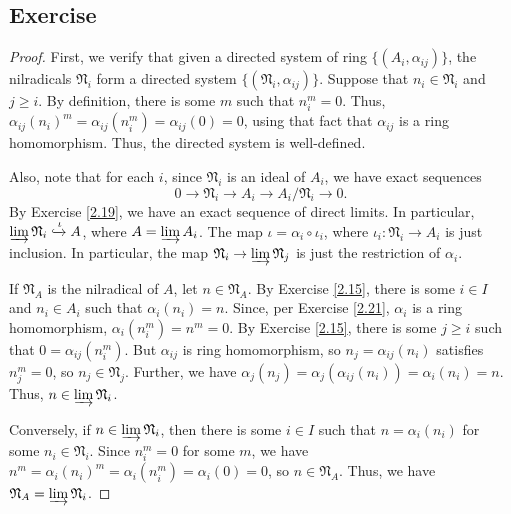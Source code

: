\subsection{Exercise}\label{2.22} %

\begin{proof}
First, we verify that given a directed system of ring $\{(A_i,\alpha_{ij})\}$, the nilradicals $\mathfrak{N}_i$ form a directed system $\{(\mathfrak{N}_i,\alpha_{ij})\}$. Suppose that
$n_i \in \mathfrak{N}_i$ and $j \ge i$. By definition, there is some $m$ such that $n_i^m = 0$. Thus, $\alpha_{ij}(n_i)^m = \alpha_{ij}(n_i^m) = \alpha_{ij}(0) = 0$, using that fact that
$\alpha_{ij}$ is a ring homomorphism. Thus, the directed system is well-defined.

Also, note that for each $i$, since $\mathfrak{N}_i$ is an ideal of $A_i$, we have exact sequences
$$0 \to \mathfrak{N}_i \to A_i \to A_i/\mathfrak{N}_i \to 0.$$
By Exercise \ref{2.19}, we have an exact sequence of direct limits. In particular, $\varinjlim \mathfrak{N}_i \xhookrightarrow{\iota} A$, where $A = \varinjlim A_i$. The map
$\iota = \alpha_i \circ \iota_i$, where $\iota_i : \mathfrak{N}_i \to A_i$ is just inclusion. In particular, the map $\mathfrak{N}_i \to \varinjlim \mathfrak{N}_j$ is just 
the restriction of $\alpha_i$.

If $\mathfrak{N}_A$ is the nilradical of $A$, let $n \in \mathfrak{N}_A$. By Exercise \ref{2.15}, there is some $i \in I$ and $n_i \in A_i$ such that
$\alpha_i(n_i) = n$. Since, per Exercise \ref{2.21}, $\alpha_i$ is a ring homomorphism, $\alpha_i(n_i^m) = n^m = 0$. By Exercise \ref{2.15}, there is some $j \ge i$ such that
$0 = \alpha_{ij}(n_i^m)$. But $\alpha_{ij}$ is ring homomorphism, so $n_j = \alpha_{ij}(n_i)$ satisfies $n_j^m = 0$, so $n_j \in \mathfrak{N}_j$. Further, we have 
$\alpha_j(n_j) = \alpha_j(\alpha_{ij}(n_i)) = \alpha_i(n_i) = n$. Thus, $n \in \varinjlim \mathfrak{N}_i$.

Conversely, if $n \in \varinjlim \mathfrak{N}_i$, then there is some $i \in I$ such that $n = \alpha_i(n_i)$ for some $n_i \in \mathfrak{N}_i$. Since $n_i^m = 0$ for some $m$, we have
$n^m = \alpha_i(n_i)^m = \alpha_i(n_i^m) = \alpha_i(0) = 0$, so $n \in \mathfrak{N}_A$. Thus, we have $\mathfrak{N}_A = \varinjlim \mathfrak{N}_i$.
\end{proof}

